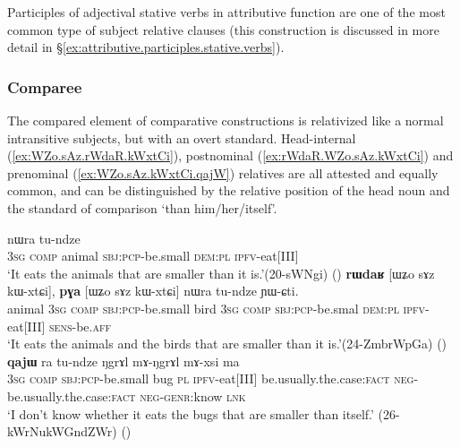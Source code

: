Participles of adjectival stative verbs in attributive function are one of the most common type of subject relative clauses (this construction is discussed in more detail in §\ref{ex:attributive.participles.stative.verbs}).

\subsubsection{Comparee} \label{comparee.relativization}
The compared element of comparative constructions is relativized like a normal intransitive subjects, but with an overt standard. Head-internal (\ref{ex:WZo.sAz.rWdaR.kWxtCi}), postnominal (\ref{ex:rWdaR.WZo.sAz.kWxtCi}) and prenominal (\ref{ex:WZo.sAz.kWxtCi.qajW}) relatives are all attested and equally common, and can be distinguished by the relative position of the head noun and the standard of comparison  `than him/her/itself'.

\begin{exe}
\ex 
\begin{xlist}
\ex \label{ex:WZo.sAz.rWdaR.kWxtCi}
 nɯra tu-ndze \\
\textsc{3sg} \textsc{comp} animal \textsc{sbj}:\textsc{pcp}-be.small \textsc{dem}:\textsc{pl} \textsc{ipfv}-eat[III] \\
\glt `It eats the animals that are smaller than it is.'(20-sWNgi)
()
\ex \label{ex:rWdaR.WZo.sAz.kWxtCi}
\gll \textbf{rɯdaʁ} [ɯʑo sɤz kɯ-xtɕi], \textbf{pɣa} [ɯʑo sɤz kɯ-xtɕi] nɯra tu-ndze ɲɯ-ɕti. \\
animal \textsc{3sg} \textsc{comp} \textsc{sbj}:\textsc{pcp}-be.small bird \textsc{3sg} \textsc{comp} \textsc{sbj}:\textsc{pcp}-be.smal \textsc{dem}:\textsc{pl} \textsc{ipfv}-eat[III] \textsc{sens}-be.\textsc{aff} \\
\glt `It eats the animals and the birds that are smaller than it is.'(24-ZmbrWpGa)
()
\ex \label{ex:WZo.sAz.kWxtCi.qajW}
 \textbf{qajɯ} ra tu-ndze ŋgrɤl mɤ-ŋgrɤl mɤ-xsi ma \\
\textsc{3sg} \textsc{comp} \textsc{sbj}:\textsc{pcp}-be.small  bug \textsc{pl} \textsc{ipfv}-eat[III] be.usually.the.case:\textsc{fact} \textsc{neg}-be.usually.the.case:\textsc{fact} \textsc{neg}-\textsc{genr}:know \textsc{lnk} \\
\glt `I don't know whether it eats the bugs that are smaller than itself.' (26-kWrNukWGndZWr)
()
\end{xlist}
\end{exe} 


